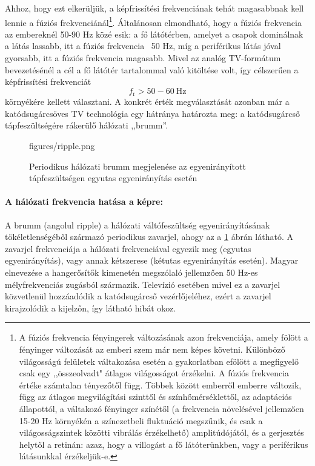 Ahhoz, hogy ezt elkerüljük, a képfrissítési frekvenciának tehát magasabbnak kell lennie a fúziós frekvenciánál\footnote{
A fúziós frekvencia fényingerek változásának azon frekvenciája, amely fölött a fényinger változását az emberi szem már nem képes követni.
Különböző világosságú felületek váltakozása esetén a gyakorlatban efölött a megfigyelő csak egy ,,összeolvadt" átlagos világosságot érzékelni.
A fúziós frekvencia értéke számtalan tényezőtől függ. 
Többek között emberről emberre változik, függ az átlagos megvilágítási szinttől és színhőmérséklettől, az adaptációs állapottól, a váltakozó fényinger színétől (a frekvencia növelésével jellemzően 15-20 Hz környékén a színezetbeli fluktuáció megszűnik, és csak a világosságszintek közötti vibrálás érzékelhető) amplitúdójától, és a gerjesztés helytől a retinán: azaz, hogy a villogást a fő látóterünkben, vagy a periférikus látásunkkal érzékeljük-e.}.
Általánosan elmondható, hogy a fúziós frekvencia az embereknél 50-90 Hz közé esik: a fő látótérben, amelyet a csapok dominálnak a látás lassabb, itt a fúziós frekvencia ~50 Hz, míg a periférikus látás jóval gyorsabb, itt a fúziós frekvencia magasabb.
Mivel az analóg TV-formátum bevezetésénél a cél a fő látótér tartalommal való kitöltése volt, így célszerűen a képfrissítési frekvenciát 
\begin{equation}
f_{\mathrm{r}} > 50-60~\mathrm{Hz} 
\end{equation}
környékére kellett választani.
A konkrét érték megválasztását azonban már a katódsugárcsöves TV technológia egy hátránya határozta meg: a katódsugárcső tápfeszültségére rákerülő hálózati ,,brumm''.

\begin{figure}[]
	\centering
	\begin{overpic}[width = 1\columnwidth ]{figures/ripple.png}
	\end{overpic}
	\caption{Periodikus hálózati brumm megjelenése az egyenirányított tápfeszültségen egyutas egyenirányítás esetén}
	\label{Fig:ripple}
\end{figure}

\paragraph*{A hálózati frekvencia hatása a képre:}
A brumm (angolul ripple) a hálózati váltófeszültség egyenirányításának tökéletlenségéből származó periodikus zavarjel, ahogy az a \ref{Fig:ripple} ábrán látható.
A zavarjel frekvenciája a hálózati frekvenciával egyezik meg (egyutas egyenirányítás), vagy annak kétszerese (kétutas egyenirányítás esetén).
Magyar elnevezése a hangerősítők kimenetén megszólaló jellemzően 50 Hz-es mélyfrekvenciás zugásból származik.
Televízió esetében mivel ez a zavarjel közvetlenül hozzáadódik a katódsugárcső vezérlőjeléhez, ezért a zavarjel kirajzolódik a kijelzőn, így látható hibát okoz.

